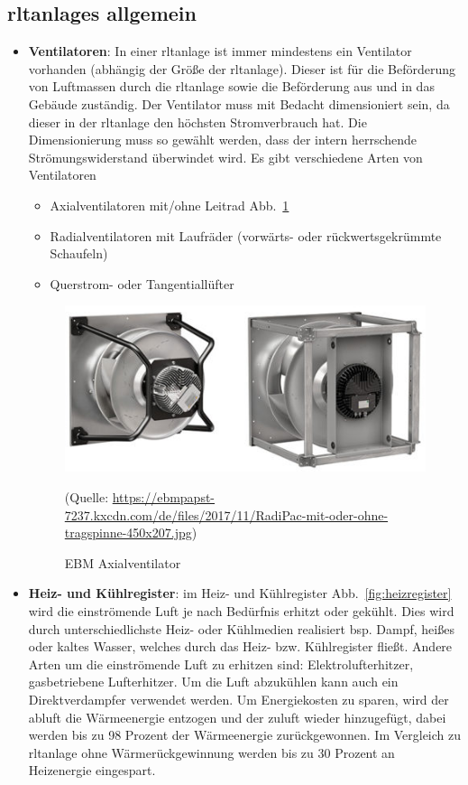 \subsection{\Acp{rltanlage} allgemein}
\begin{itemize}
	\item \textbf{Ventilatoren}: In einer \ac{rltanlage} ist immer mindestens ein Ventilator vorhanden (abhängig der Größe der \ac{rltanlage}). Dieser ist für die Beförderung von Luftmassen durch die \ac{rltanlage} sowie die Beförderung aus und in das Gebäude zuständig. Der Ventilator muss mit Bedacht dimensioniert sein, da dieser in der \ac{rltanlage} den höchsten Stromverbrauch hat. Die Dimensionierung muss so gewählt werden, dass der intern herrschende Strömungswiderstand überwindet wird. Es gibt verschiedene Arten von Ventilatoren 
\begin{itemize}
	\item Axialventilatoren mit/ohne Leitrad Abb.~\ref{fig:EBM_Axialventilator}
	\item Radialventilatoren mit Laufräder (vorwärts- oder rückwertsgekrümmte Schaufeln)
	\item Querstrom- oder Tangentiallüfter 
\end{itemize}

\begin{figure}[H]
	\centering
	\includegraphics[width=0.5\linewidth]{Bilder/axialventilator}
	\caption{EBM Axialventilator} 
	(Quelle: \url{https://ebmpapst-7237.kxcdn.com/de/files/2017/11/RadiPac-mit-oder-ohne-tragspinne-450x207.jpg})
	\label{fig:EBM_Axialventilator}
\end{figure}

	\item \textbf{Heiz- und Kühlregister}: im Heiz- und Kühlregister Abb.~\ref{fig:heizregister} wird die einströmende Luft je nach Bedürfnis erhitzt oder gekühlt. Dies wird durch unterschiedlichste Heiz- oder Kühlmedien realisiert bsp. Dampf, heißes oder kaltes Wasser, welches durch das Heiz- bzw. Kühlregister fließt. Andere Arten um die einströmende Luft zu erhitzen sind: Elektrolufterhitzer, gasbetriebene Lufterhitzer. Um die Luft abzukühlen kann auch ein Direktverdampfer verwendet werden.
	Um Energiekosten zu sparen, wird der \gls{abluft} die Wärmeenergie entzogen und der \gls{zuluft} wieder hinzugefügt, dabei werden bis zu 98 Prozent der Wärmeenergie zurückgewonnen. Im Vergleich zu \ac{rltanlage} ohne Wärmerückgewinnung werden bis zu 30 Prozent an Heizenergie eingespart. 


\end{itemize}

